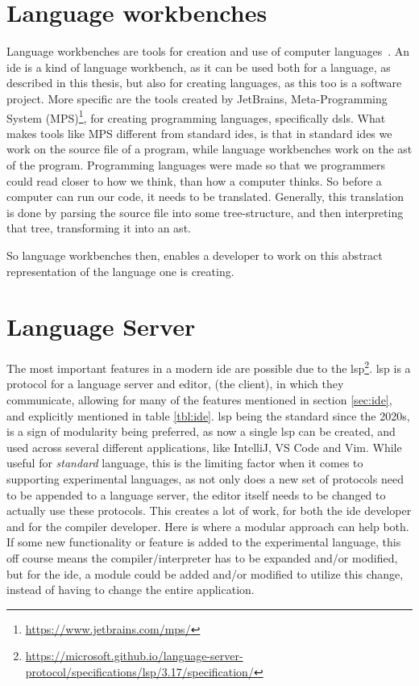 \section{Language workbenches}

Language workbenches are tools for creation and use of computer languages~\cite{lwb}.
An \gls*{ide} is a kind of language workbench, as it can be used both for a
language, as described in this thesis, but also for creating languages, as this
too is a software project. More specific are the tools created by JetBrains,
Meta-Programming System (MPS)\footnote{\url{https://www.jetbrains.com/mps/}},
for creating programming languages, specifically \gls*{dsl}s. What makes tools
like MPS different from standard \gls*{ide}s, is that in standard \gls*{ide}s we
work on the source file of a program, while language workbenches work on the
\gls*{ast} of the program. Programming languages were made so that we
programmers could read closer to how we think, than how a computer thinks. So
before a computer can run our code, it needs to be translated. Generally, this
translation is done by parsing the source file into some tree-structure, and
then interpreting that tree, transforming it into an \gls*{ast}.

So language workbenches then, enables a developer to work on this abstract
representation of the language one is creating.


\section{Language Server}

The most important features in a modern \gls*{ide} are possible due to the
\gls*{lsp}\footnote{\url{https://microsoft.github.io/language-server-protocol/specifications/lsp/3.17/specification/}}.
\gls*{lsp} is a protocol for a language server and editor, (the client), in
which they communicate, allowing for many of the features mentioned in section
\ref{sec:ide}, and explicitly mentioned in table \ref{tbl:ide}. \gls*{lsp} being
the standard since the 2020s, is a sign of modularity being preferred, as now a
single \gls*{lsp} can be created, and used across several different
applications, like IntelliJ, VS Code and Vim. While useful for
\textit{standard} language, this is the limiting factor when it comes to
supporting experimental languages, as not only does a new set of protocols need
to be appended to a language server, the editor itself needs to be changed to
actually use these protocols. This creates a lot of work, for both the
\gls*{ide} developer and for the compiler developer. Here is where a modular
approach can help both. If some new functionality or feature is added to the
experimental language, this off course means the compiler/interpreter has to be
expanded and/or modified, but for the \gls*{ide}, a module could be added and/or
modified to utilize this change, instead of having to change the entire
application.

